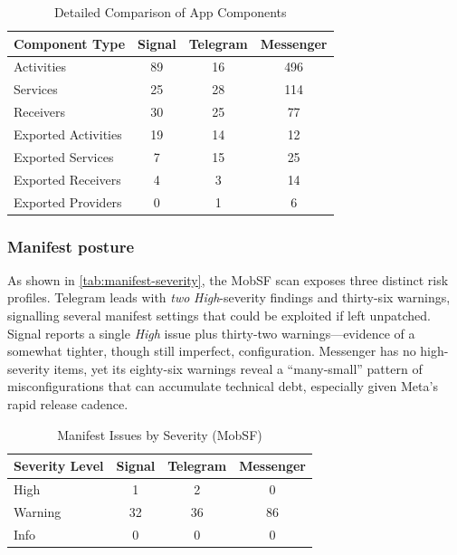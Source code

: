 \documentclass[a4paper,12pt]{report}
\begin{document}
\begin{table}[htbp]
  \centering
  \caption{Detailed Comparison of App Components}
  \label{tab:app-components-horizontal}
  \begin{tabular}{|l|c|c|c|}
    \hline
    \textbf{Component Type} & \textbf{Signal} & \textbf{Telegram} & \textbf{Messenger} \\ \hline
    Activities & 89 & 16 & 496 \\ \hline
    Services & 25 & 28 & 114 \\ \hline
    Receivers & 30 & 25 & 77 \\ \hline

    Exported Activities & 19 & 14 & 12 \\ \hline
    Exported Services & 7 & 15 & 25 \\ \hline
    Exported Receivers & 4 & 3 & 14 \\ \hline
    Exported Providers & 0 & 1 & 6 \\ \hline
  \end{tabular}
\end{table}



\subsubsection{Manifest posture}
As shown in \autoref{tab:manifest-severity}, the MobSF scan exposes three distinct risk profiles.
Telegram leads with \emph{two} \emph{High}-severity findings and thirty-six warnings, signalling several manifest settings that could be exploited if left unpatched.
Signal reports a single \emph{High} issue plus thirty-two warnings—evidence of a somewhat tighter, though still imperfect, configuration.
Messenger has no high-severity items, yet its eighty-six warnings reveal a “many-small” pattern of misconfigurations that can accumulate technical debt, especially given Meta’s rapid release cadence.

\begin{table}[htbp]
  \centering
  \caption{Manifest Issues by Severity (MobSF)}
  \label{tab:manifest-severity}
  \begin{tabular}{|l|c|c|c|}
    \hline
    \textbf{Severity Level} & \textbf{Signal} & \textbf{Telegram} & \textbf{Messenger} \\ \hline
    High      & 1  & 2  & 0  \\ \hline
    Warning   & 32 & 36 & 86 \\ \hline
    Info      & 0  & 0  & 0  \\ \hline
  \end{tabular}
\end{table}
\end{document}
